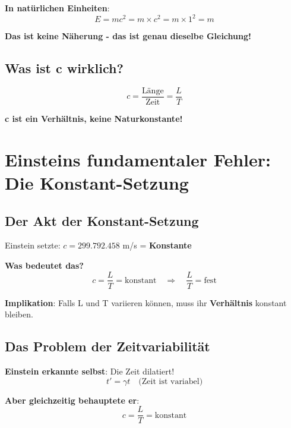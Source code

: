 \documentclass[12pt,a4paper]{article}
\begin{document}
	\textbf{In natürlichen Einheiten}:
	\begin{equation}
		E = mc^2 = m \times c^2 = m \times 1^2 = m
	\end{equation}
	
	\textbf{Das ist keine Näherung - das ist genau dieselbe Gleichung!}
	
	\subsection{Was ist c wirklich?}
	
	\begin{equation}
		c = \frac{\text{Länge}}{\text{Zeit}} = \frac{L}{T}
	\end{equation}
	
	\textbf{c ist ein Verhältnis, keine Naturkonstante!}
	
	\section{Einsteins fundamentaler Fehler: Die Konstant-Setzung}
	
	\subsection{Der Akt der Konstant-Setzung}
	
	Einstein setzte: $c = 299.792.458$ m/s = \textbf{Konstante}
	
	\textbf{Was bedeutet das?}
	\begin{equation}
		c = \frac{L}{T} = \text{konstant} \quad \Rightarrow \quad \frac{L}{T} = \text{fest}
	\end{equation}
	
	\textbf{Implikation}: Falls L und T variieren können, muss ihr \textbf{Verhältnis} konstant bleiben.
	
	\subsection{Das Problem der Zeitvariabilität}
	
	\textbf{Einstein erkannte selbst}: Die Zeit dilatiert!
	\begin{equation}
		t' = \gamma t \quad \text{(Zeit ist variabel)}
	\end{equation}
	
	\textbf{Aber gleichzeitig behauptete er}: 
	\begin{equation}
		c = \frac{L}{T} = \text{konstant}
	\end{equation}
	
\end{document}
